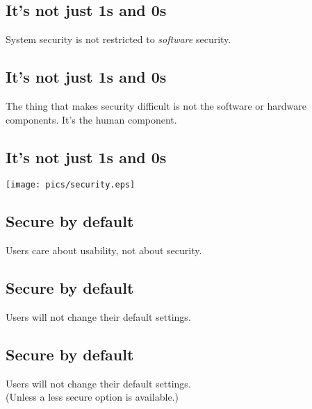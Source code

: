 \documentclass[xga]{xdvislides}
\begin{document}
\subsection{It's not just 1s and 0s}
\vspace{.5in}
\Huge
\begin{center}
System security is not restricted to {\em software} security.
\end{center}
\Normalsize

\subsection{It's not just 1s and 0s}
\vspace{.5in}
\Huge
\begin{center}
The thing that makes security difficult is not the software or hardware
components.  It's the human component.
\end{center}
\Normalsize

\subsection{It's not just 1s and 0s}
\vspace*{\fill}
\begin{center}
	\texttt{[image: pics/security.eps]}
\end{center}
\vspace*{\fill}



\subsection{Secure by default}
\vspace{.5in}
\Huge
\begin{center}
Users care about usability, not about security.
\end{center}
\Normalsize

\subsection{Secure by default}
\vspace{.5in}
\Huge
\begin{center}
Users will not change their default settings.
\end{center}
\Normalsize

\subsection{Secure by default}
\vspace{.5in}
\Huge
\begin{center}
Users will not change their default settings. \\
\Normalsize
(Unless a less secure option is available.)
\end{center}
\end{document}
